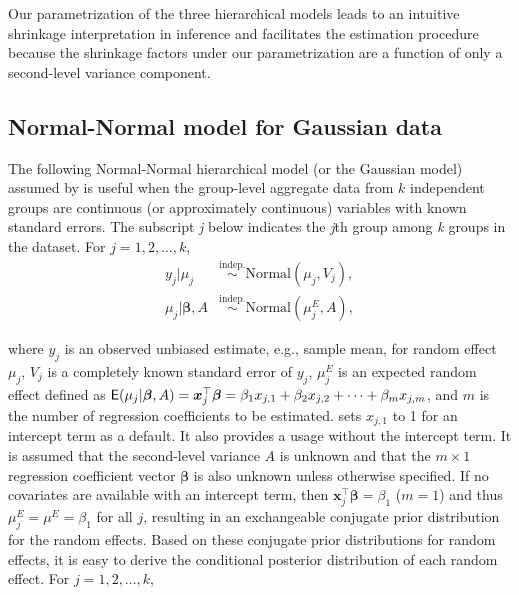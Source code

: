 \documentclass[article]{jss}
\begin{document}
Our parametrization of the three hierarchical models leads to an intuitive shrinkage interpretation in inference and  facilitates the estimation procedure because the shrinkage factors under our parametrization are a function of only a second-level variance component.
 
\subsection[Normal-Normal]{Normal-Normal model for Gaussian data}
The following Normal-Normal hierarchical model (or the Gaussian model) assumed by  is useful when the group-level aggregate data from $k$ independent  groups are continuous (or approximately continuous) variables with known standard errors. The subscript \emph{j} below indicates the \emph{j}th group among \emph{k} groups in the dataset. For $j=1, 2, \ldots, k$, 
\begin{align}
y_{j}\vert \mu_{j} & \stackrel{\textrm{indep.}}{\sim} \textrm{Normal}(\mu_{j}, V_{j}),\label{normalobs}\\
\mu_{j}\vert \boldsymbol{\beta}, A & \stackrel{\textrm{indep.}}{\sim} \textrm{Normal}(\mu^E_{j}, A),\label{normalprior}
\end{align}


where $y_j$ is an observed unbiased estimate, e.g., sample mean, for random effect $\mu_j$, $V_{j}$ is a completely known standard error of $y_j$, $\mu^E_{j}$ is an expected random effect defined as $\mathsf{E}(\mu_j\vert \boldsymbol{\beta}, A) = \boldsymbol{x}_j^\top \boldsymbol{\beta}=\beta_{1}x_{j, 1}+\beta_{2}x_{j, 2} + \cdots + \beta_{m}x_{j, m}$, and $m$ is the number of regression coefficients to be estimated.  sets $x_{j, 1}$ to 1 for an intercept term as a default. It also provides a usage without the intercept term.  It is assumed that the second-level variance $A$ is unknown and that the $m\times1$ regression coefficient vector $\boldsymbol{\beta}$ is also unknown unless otherwise specified. If no covariates are available with an intercept term, then $\boldsymbol{x}_j^\top \boldsymbol{\beta}=\beta_1$ ($m=1$) and thus $\mu^E_{j}=\mu^E=\beta_1$ for all $j$, resulting in an exchangeable conjugate prior distribution for the random effects.  Based on these conjugate prior distributions for random effects, it is easy to derive the conditional posterior distribution of each random effect. For $j=1, 2, \ldots, k$,
\end{document}
